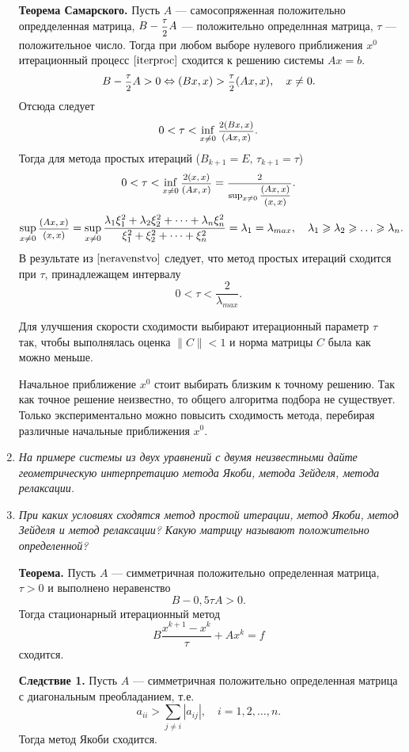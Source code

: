 \documentclass[12pt, a4paper]{article}
\begin{document}
\begin{enumerate}
		\textbf{Теорема Самарского.} Пусть $A$ --- самосопряженная положительно опредделенная матрица, $B-\hbox{\footnotesize$\displaystyle\frac{\tau}{2}$}A$ --- положительно определнная матрица, $\tau$ --- положительное число. Тогда при любом выборе нулевого приближения $x^0$ итерационный процесс $\ref{iterproc}$ сходится к решению системы $Ax=b$. 
		\[
		B-\hbox{\footnotesize$\displaystyle\frac{\tau}{2}$}A>0 \Leftrightarrow
		(Bx,x)>\hbox{\footnotesize$\displaystyle\frac{\tau}{2}$}(Ax,x),\quad x \ne 0.
		\]
		Отсюда следует
		\[
		0<\tau<\inf_{x \ne 0} \hbox{\footnotesize$\displaystyle\frac{2(Bx,x)}{(Ax,x)}$}.
		\]
		Тогда для метода простых итераций ($B_{k+1}=E,\, \tau_{k+1} = \tau$)
		\begin{equation}
	0<\tau<\inf_{x \ne 0} 			\hbox{\footnotesize$\displaystyle\frac{2(x,x)}{(Ax,x)}$}=\hbox{\footnotesize$\displaystyle\frac{2}{\sup_{x \ne 0}\hbox{\footnotesize$\displaystyle\frac{(Ax,x)}{(x,x)}$}}$}.
	\label{neravenstvo}
		\end{equation}
		\[
		\sup_{x \ne 0}\sfrac{(Ax,x)}{(x,x)} = \sup_{x \ne 0} \frac{\lambda_1\xi_1^2+\lambda_2\xi_2^2+\dots +\lambda_n\xi_n^2}{\xi_1^2+\xi_2^2+\dots+\xi_n^2} =  \lambda_{1} = \lambda_{max},\quad \lambda_{1} \ge \lambda_{2} \ge \dots \ge \lambda_{n}.
		\]
		В результате из $\ref{neravenstvo}$ следует, что метод простых итераций сходится при $\tau$, принадлежащем интервалу
		\[
		0<\tau<\frac{2}{\lambda_{max}}.
		\]
		
		 Для улучшения скорости сходимости выбирают итерационный параметр $\tau$ так, чтобы выполнялась оценка $\|C\| < 1$ и норма матрицы $C$ была как можно меньше.
		
		Начальное приближение $x^0$ стоит выбирать близким к точному решению. Так как точное решение неизвестно, то общего алгоритма подбора не существует. Только экспериментально можно  повысить сходимость метода, перебирая различные начальные приближения $x^0$.
		
		\item \textit{На примере системы из двух уравнений с двумя неизвестными дайте геометрическую интерпретацию метода Якоби, метода Зейделя, метода релаксации.}
		\smallskip
		
		\item \textit{При каких условиях сходятся метод простой итерации,
			метод Якоби, метод Зейделя и метод релаксации? Какую
			матрицу называют положительно определенной?}
		\smallskip

		\textbf{Теорема.} Пусть $A$ --- симметричная положительно определенная матрица, $\tau>0$ и выполнено неравенство
		\[
		B-0,5 \tau A >0.
		\] 
		Тогда стационарный итерационный метод
		\[
		B \frac{x^{k+1}-x^{k}}{\tau}+Ax^{k}=f
		\]
		сходится.
		
		\textbf{Следствие 1.} Пусть $A$ --- симметричная положительно определенная матрица с диагональным преобладанием, т.е.
		\[
		a_{ii}> \sum_{j \ne i} |a_{ij}|,\quad i =1,2,\dots,n.
		\]
		Тогда метод Якоби сходится.
		

\end{enumerate}
\end{document}
